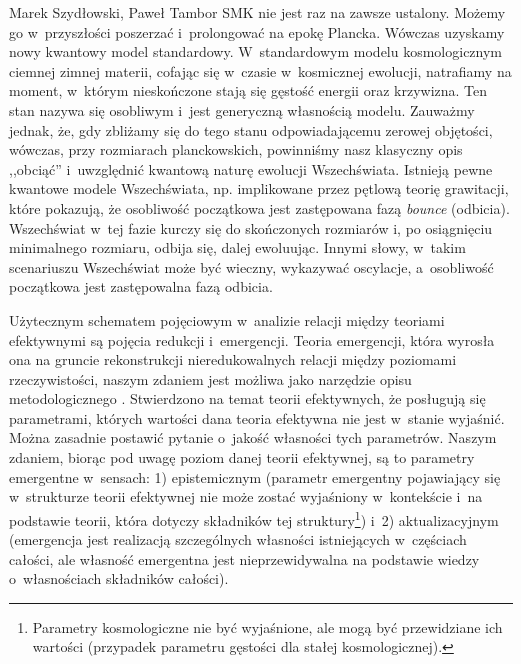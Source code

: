 \begin{artplenv2auth}{Marek Szydłowski, Paweł Tambor}
 SMK nie jest raz na zawsze ustalony. Możemy go w~przyszłości poszerzać i~prolongować na epokę Plancka. Wówczas uzyskamy nowy kwantowy model standardowy. W~standardowym modelu kosmologicznym ciemnej zimnej materii, cofając się w~czasie w~kosmicznej ewolucji, natrafiamy na moment, w~którym nieskończone stają się gęstość energii oraz krzywizna. Ten stan nazywa się osobliwym i~jest generyczną własnością modelu. Zauważmy jednak, że, gdy zbliżamy się do tego stanu odpowiadającemu zerowej objętości, wówczas, przy rozmiarach planckowskich, powinniśmy nasz klasyczny opis ,,obciąć'' i~uwzględnić kwantową naturę ewolucji Wszechświata. Istnieją pewne kwantowe modele Wszechświata, np. implikowane przez pętlową teorię grawitacji, które pokazują, że osobliwość początkowa jest zastępowana fazą \textit{bounce} (odbicia). Wszechświat w~tej fazie kurczy się do skończonych rozmiarów i, po osiągnięciu minimalnego rozmiaru, odbija się, dalej ewoluując. Innymi słowy, w~takim scenariuszu Wszechświat może być wieczny, wykazywać oscylacje, a~osobliwość początkowa jest zastępowalna fazą odbicia.

Użytecznym schematem pojęciowym w~analizie relacji między teoriami efektywnymi są pojęcia redukcji i~emergencji. Teoria emergencji, która wyrosła ona na gruncie rekonstrukcji nieredukowalnych relacji między poziomami rzeczywistości, naszym zdaniem jest możliwa jako narzędzie opisu metodologicznego
\parencite[][]{kim_making_1999}. %
 Stwierdzono na temat teorii efektywnych, że posługują się parametrami, których wartości dana teoria efektywna nie jest w~stanie wyjaśnić. Można zasadnie postawić pytanie o~jakość własności tych parametrów. Naszym zdaniem, biorąc pod uwagę poziom danej teorii efektywnej, są to parametry emergentne w~sensach: 1) epistemicznym (parametr emergentny pojawiający się w~strukturze teorii efektywnej nie może zostać wyjaśniony w~kontekście i~na podstawie teorii, która dotyczy składników tej struktury\footnote{Parametry kosmologiczne nie być wyjaśnione, ale mogą być przewidziane ich wartości (przypadek parametru gęstości dla stałej kosmologicznej).}) i~2) aktualizacyjnym (emergencja jest realizacją szczególnych własności istniejących w~częściach całości, ale własność emergentna jest nieprzewidywalna na podstawie wiedzy o~własnościach składników całości).


\end{artplenv2auth}
